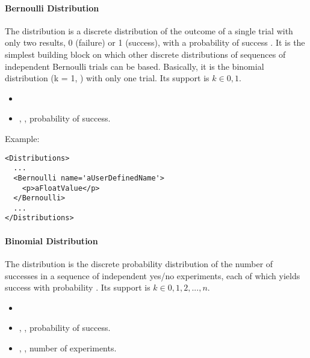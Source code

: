 \paragraph{Bernoulli Distribution}
\label{Bernoulli}
The  distribution is a discrete distribution of the outcome
of a single trial with only two results, 0 (failure) or 1 (success), with a
probability of success .
%
It is the simplest building block on which other discrete distributions of
sequences of independent Bernoulli trials can be based.
%
Basically, it is the binomial distribution (k = 1, ) with only
one trial.
%
Its support is $k \in {0, 1}$.

%
\attrIntro
\vspace{-5mm}
\begin{itemize}
  \itemsep0em
  \item \nameDescription
\end{itemize}
\vspace{-5mm}
\subnodeIntro
\begin{itemize}
  \item {}, , probability of
  success.
 \end{itemize}
Example:
\begin{lstlisting}[style=XML]
<Distributions>
  ...
  <Bernoulli name='aUserDefinedName'>
    <p>aFloatValue</p>
  </Bernoulli>
  ...
</Distributions>
\end{lstlisting}

\paragraph{Binomial Distribution}
\label{Binomial}
The  distribution is the discrete probability distribution of
the number of successes in a sequence of  independent yes/no
experiments, each of which yields success with probability .
%
Its support is $k \in {0, 1, 2, ..., n}$.

%
\attrIntro
\vspace{-5mm}
\begin{itemize}
  \itemsep0em
  \item \nameDescription
\end{itemize}
\vspace{-5mm}
\subnodesIntro
\begin{itemize}
  \item {}, , probability of
  success.
  \item {}, , number of
  experiments.
\end{itemize}

